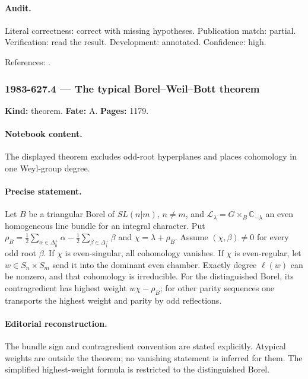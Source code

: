 \paragraph{Audit.} Literal correctness: correct with missing hypotheses. Publication match: partial. Verification: read the result. Development: annotated. Confidence: high.

\noindent References: \citep{penkov1988borel}.\par

\subsubsection{1983-627.4 --- The typical Borel–Weil–Bott theorem}

\label{item:1983-627.4}

\noindent\textbf{Kind:} theorem. \textbf{Fate:} A. \textbf{Pages:} 1179.\par

\paragraph{Notebook content.} The displayed theorem excludes odd-root hyperplanes and places cohomology in one Weyl-group degree.

\paragraph{Precise statement.} Let \(B\) be a triangular Borel of \(SL(n|m)\), \(n\ne m\), and \(\mathcal L_\lambda=G\times_B\mathbb C_{-\lambda}\) an even homogeneous line bundle for an integral character. Put \(\rho_B=\frac12\sum_{\alpha\in\Delta^+_{\overline0}}\alpha-\frac12\sum_{\beta\in\Delta^+_{\overline1}}\beta\) and \(\chi=\lambda+\rho_B\). Assume \((\chi,\beta)\ne0\) for every odd root \(\beta\). If \(\chi\) is even-singular, all cohomology vanishes. If \(\chi\) is even-regular, let \(w\in S_n\times S_m\) send it into the dominant even chamber. Exactly degree \(\ell(w)\) can be nonzero, and that cohomology is irreducible. For the distinguished Borel, its contragredient has highest weight \(w\chi-\rho_B\); for other parity sequences one transports the highest weight and parity by odd reflections.

\paragraph{Editorial reconstruction.} The bundle sign and contragredient convention are stated explicitly. Atypical weights are outside the theorem; no vanishing statement is inferred for them. The simplified highest-weight formula is restricted to the distinguished Borel.

